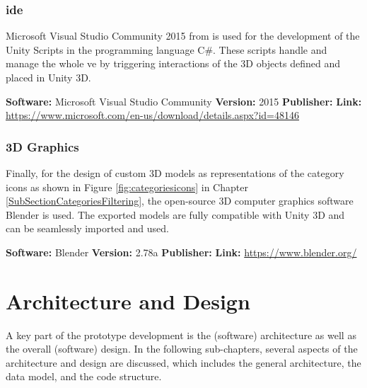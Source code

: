 \subsubsection{\gls{ide}}
Microsoft Visual Studio Community 2015 from  is used for the development of the Unity Scripts in the programming language C\#. These scripts handle and manage the whole \gls{ve} by triggering interactions of the 3D objects defined and placed in Unity 3D.

\textbf{Software:} Microsoft Visual Studio Community \newline
\textbf{Version:} 2015 \newline
\textbf{Publisher:} \cite{Microsoft2015} \newline
\textbf{Link:} \url{https://www.microsoft.com/en-us/download/details.aspx?id=48146}
 

\subsubsection{3D Graphics}

Finally, for the design of custom 3D models as representations of the category icons as shown in Figure \ref{fig:categoriesicons} in Chapter \ref{SubSectionCategoriesFiltering}, the  open-source 3D computer graphics software Blender is used. The exported models are fully compatible with Unity 3D and can be seamlessly imported and used.

\textbf{Software:} Blender \newline
\textbf{Version:} 2.78a \newline
\textbf{Publisher:} \cite{Blender2016} \newline
\textbf{Link:} \url{https://www.blender.org/}



\section{Architecture and Design}

A key part of the prototype development is the (software) architecture as well as the overall (software) design. In the following sub-chapters, several aspects of the architecture and design are discussed, which includes the general architecture, the data model, and the code structure.


